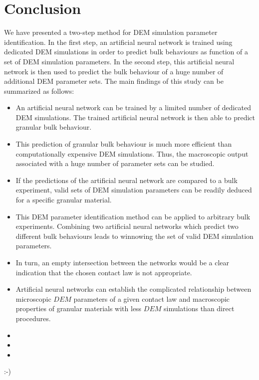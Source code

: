 
\part{Conclusion}
\label{par:conclusion}

We have presented a two-step method for \acs{DEM} simulation parameter
identification. 
In the first step, an artificial neural network is 
trained using dedicated \acs{DEM} simulations in order to predict bulk 
behaviours as function of a set of \acs{DEM} simulation parameters. 
In the second step, this artificial neural network is then used 
to predict the bulk behaviour of a huge number of additional \acs{DEM} parameter
sets.
The main findings of this study can be summarized as follows:
\begin{itemize}
  \item{An artificial neural network can be trained by a limited number of
  dedicated \acs{DEM} simulations.
  		The trained artificial neural network is then able to predict
  		granular bulk behaviour.}
  \item{This prediction of granular bulk behaviour is much more efficient
  		than computationally expensive \acs{DEM} simulations.
  		Thus, the macroscopic output associated with a huge number of parameter sets
  		can be studied.}
  \item{If the predictions of the artificial neural network are compared to a bulk experiment, 
  		valid sets of \acs{DEM} simulation parameters can be readily deduced for a
  		specific granular material.}
  \item{This \acs{DEM} parameter identification method can be applied to
  arbitrary bulk experiments.
  		Combining two artificial neural networks which predict two different bulk
  		behaviours leads to winnowing the set of valid \acs{DEM} simulation parameters.}
  		
    \item{In turn, an empty intersection between the networks would be a clear
  		indication that the chosen contact law is not appropriate.}
  \item{Artificial neural networks can establish the complicated relationship
  		between microscopic $DEM$ parameters of a given contact law and macroscopic
  		properties of granular materials with less $DEM$ simulations than direct
  		procedures.}		
   \item{}
   \item{}
   \item{}
\end{itemize}
:-)

